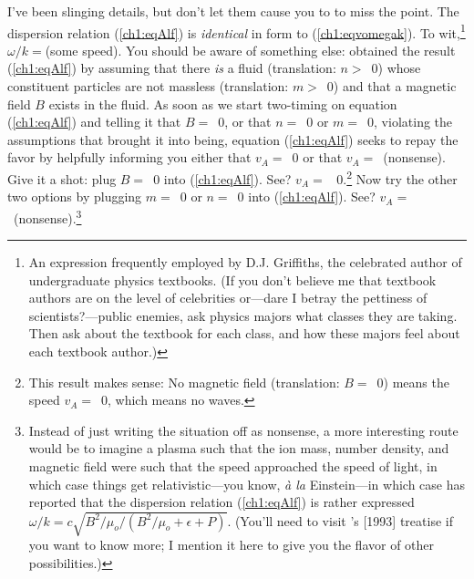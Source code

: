 I've been slinging details, but don't let them cause you to to miss the
point. The dispersion relation (\ref{ch1:eqAlf}) is \emph{identical} in form to
(\ref{ch1:eqvomegak}). To wit,\footnote{An expression frequently employed by
  D.J. Griffiths, the celebrated author of undergraduate physics textbooks. (If
  you don't believe me that textbook authors are on the level of celebrities
  or---dare I betray the pettiness of scientists?---public enemies, ask physics
  majors what classes they are taking. Then ask about the textbook for each
  class, and how these majors feel about each textbook author.)}
$ \omega / k = $(some speed). You should be aware of something else: \Alf
obtained the result (\ref{ch1:eqAlf}) by assuming that there \emph{is} a fluid
(translation: $n >$~0) whose constituent particles are not massless
(translation: $m >$~0) and that a magnetic field $B$ exists in the fluid. As
soon as we start two-timing on equation (\ref{ch1:eqAlf}) and telling it that
$B =$~0, or that $n =$~0 or $m =$~0, violating the assumptions that brought it
into being, equation (\ref{ch1:eqAlf}) seeks to repay the favor by helpfully
informing you either that $v_A =$~0 or that $v_A =$~(nonsense). Give it a shot:
plug $B =$~0 into (\ref{ch1:eqAlf}). See? $v_A =$~ 0.\footnote{This result makes
  sense: No magnetic field (translation: $B =$~0) means the \Alf speed
  $v_A =$~0, which means no \Alf waves.}  Now try the other two options by
plugging $m =$~0 or $n =$~0 into (\ref{ch1:eqAlf}). See?
$v_A =$~(nonsense).\footnote{Instead of just writing the situation off as
  nonsense, a more interesting route would be to imagine a plasma such that the
  ion mass, number density, and magnetic field were such that the \Alf speed
  approached the speed of light, in which case things get relativistic---you
  know, \textit{\`{a} la} Einstein---in which case \citet{Gedalin1993} has
  reported that the dispersion relation (\ref{ch1:eqAlf}) is rather expressed
  $\omega / k = c \sqrt{B^2/\mu_o / (B^2/\mu_o + \epsilon + P)}$. (You'll need
  to visit \citeauthor{Gedalin1993}'s [1993] treatise if you want to know more;
  I mention it here to give you the flavor of other
  possibilities.)}%


